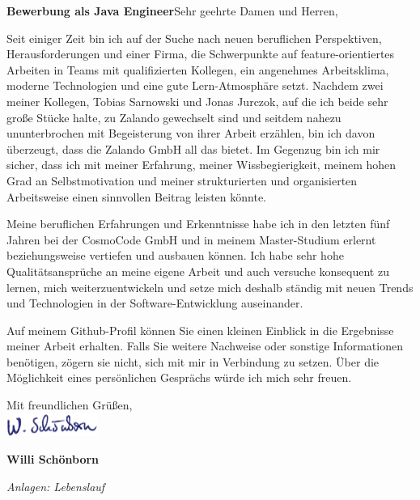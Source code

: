 \documentclass[11pt,a4paper,sans]{moderncv} %
\begin{document}


\clearpage

\date{\today} %
\opening{\textbf{Bewerbung als Java Engineer}\newline{}\newline{}Sehr geehrte Damen und Herren,} %
\closing{} %

\makelettertitle %

Seit einiger Zeit bin ich auf der Suche nach neuen beruflichen Perspektiven, Herausforderungen und einer Firma, die Schwerpunkte auf feature-orientiertes Arbeiten in Teams mit qualifizierten Kollegen, ein angenehmes Arbeitsklima, moderne Technologien und eine gute Lern-Atmosphäre setzt. Nachdem zwei meiner Kollegen, Tobias Sarnowski und Jonas Jurczok, auf die ich beide sehr große Stücke halte, zu Zalando gewechselt sind und seitdem nahezu ununterbrochen mit Begeisterung von ihrer Arbeit erzählen, bin ich davon überzeugt, dass die Zalando GmbH all das bietet. Im Gegenzug bin ich mir sicher, dass ich mit meiner Erfahrung, meiner Wissbegierigkeit, meinem hohen Grad an Selbstmotivation und meiner strukturierten und organisierten Arbeitsweise einen sinnvollen Beitrag leisten könnte.

Meine beruflichen Erfahrungen und Erkenntnisse habe ich in den letzten fünf Jahren bei der CosmoCode GmbH und in meinem Master-Studium erlernt beziehungsweise vertiefen und ausbauen können. Ich habe sehr hohe Qualitätsansprüche an meine eigene Arbeit und auch versuche konsequent zu lernen, mich weiterzuentwickeln und setze mich deshalb ständig mit neuen Trends und Technologien in der Software-Entwicklung auseinander.

Auf meinem Github-Profil können Sie einen kleinen Einblick in die Ergebnisse meiner Arbeit erhalten. Falls Sie weitere Nachweise oder sonstige Informationen benötigen, zögern sie nicht, sich mit mir in Verbindung zu setzen. Über die Möglichkeit eines persönlichen Gesprächs würde ich mich sehr freuen.

Mit freundlichen Grüßen,\\[1.5em]
\includegraphics[width=3cm]{pictures/signature}

\bfseries{Willi Schönborn}

\color{color2}\itshape Anlagen: Lebenslauf

\end{document}
